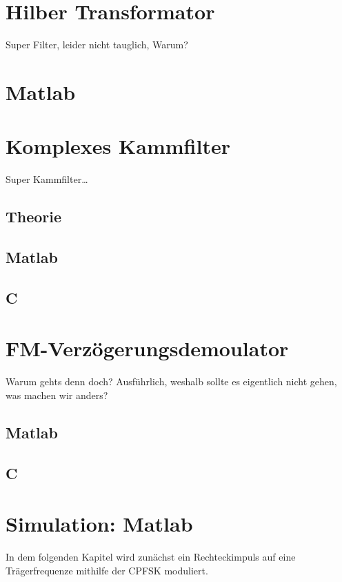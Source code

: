 \documentclass{article}
\begin{document}
\section{Hilber Transformator}\label{sec:hilbert}
Super Filter, leider nicht tauglich, Warum?

\section{Matlab}

\section{Komplexes Kammfilter}\label{sec:comb}
Super Kammfilter\dots
\subsection{Theorie}

\subsection{Matlab}

\subsection{C}

\section{FM-Verzögerungsdemoulator}
Warum gehts denn doch? Ausführlich, weshalb sollte es eigentlich nicht gehen, was machen wir anders?
\subsection{Matlab}

\subsection{C}

\section{Simulation: Matlab}
In dem folgenden Kapitel wird zunächst ein Rechteckimpuls auf eine Trägerfrequenze mithilfe der \ac{CPFSK} moduliert.
\end{document}
